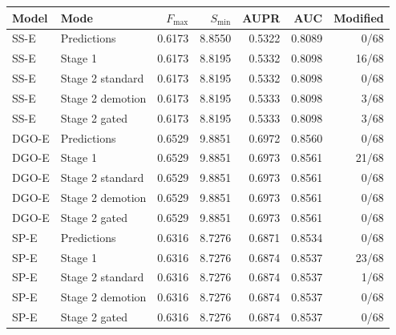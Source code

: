 \begin{tabular}{llrrrrr}
\toprule
Model & Mode & $F_{\max}$ & $S_{\min}$ & AUPR & AUC & Modified \\
\midrule
SS-E & Predictions & 0.6173 & 8.8550 & 0.5322 & 0.8089 & 0/68 \\
SS-E & Stage 1 & 0.6173 & 8.8195 & 0.5332 & 0.8098 & 16/68 \\
SS-E & Stage 2 standard & 0.6173 & 8.8195 & 0.5332 & 0.8098 & 0/68 \\
SS-E & Stage 2 demotion & 0.6173 & 8.8195 & 0.5333 & 0.8098 & 3/68 \\
SS-E & Stage 2 gated & 0.6173 & 8.8195 & 0.5333 & 0.8098 & 3/68 \\
DGO-E & Predictions & 0.6529 & 9.8851 & 0.6972 & 0.8560 & 0/68 \\
DGO-E & Stage 1 & 0.6529 & 9.8851 & 0.6973 & 0.8561 & 21/68 \\
DGO-E & Stage 2 standard & 0.6529 & 9.8851 & 0.6973 & 0.8561 & 0/68 \\
DGO-E & Stage 2 demotion & 0.6529 & 9.8851 & 0.6973 & 0.8561 & 0/68 \\
DGO-E & Stage 2 gated & 0.6529 & 9.8851 & 0.6973 & 0.8561 & 0/68 \\
SP-E & Predictions & 0.6316 & 8.7276 & 0.6871 & 0.8534 & 0/68 \\
SP-E & Stage 1 & 0.6316 & 8.7276 & 0.6874 & 0.8537 & 23/68 \\
SP-E & Stage 2 standard & 0.6316 & 8.7276 & 0.6874 & 0.8537 & 1/68 \\
SP-E & Stage 2 demotion & 0.6316 & 8.7276 & 0.6874 & 0.8537 & 0/68 \\
SP-E & Stage 2 gated & 0.6316 & 8.7276 & 0.6874 & 0.8537 & 0/68 \\
\bottomrule
\end{tabular}
